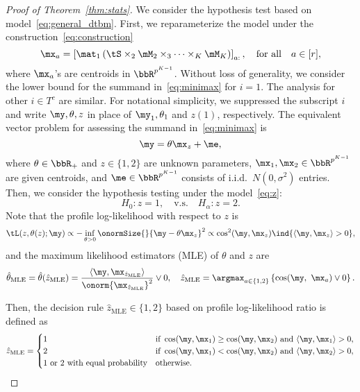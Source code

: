 \documentclass[lettersize,onecolumn,journal]{IEEEtran}
\theoremstyle{definition}
\theoremstyle{definition}
\newcommand{\of}[1]{\left(#1\right)}
\newcommand{\off}[1]{\left[#1\right]}
\newcommand{\offf}[1]{\left\{#1\right\}}
\begin{document}
\begin{proof}[Proof of Theorem~\ref{thm:stats}]
We consider the hypothesis test based on model~\eqref{eq:general_dtbm}. First, we reparameterize the model under the construction~\eqref{eq:construction}
\begin{equation}
    \mx_a = \off{\mat_1 \of{ \tS\times_2 \mM_2\times_3\cdots \times_K \mM_K  }}_{a:}, \quad \text{for all} \quad a \in [r],
\end{equation}
where $\mx_a$'s are centroids in $\bbR^{p^{K-1}}$. Without loss of generality, we consider the lower bound for the summand in~\eqref{eq:minimax} for $i=1$. The analysis for other $i\in T^c$ are similar. For notational simplicity, we suppressed the subscript $i$ and write $\my, \theta, z$ in place of $\my_1, \theta_1$ and $z(1)$, respectively. The equivalent vector problem for assessing the summand in~\eqref{eq:minimax} is
\begin{equation}\label{eq:z}
\my=\theta\mx_{z}+\me,
\end{equation}
where $\theta\in\bbR_{+}$ and $z\in \{1,2\}$ are unknown parameters, $\mx_1,\mx_2\in\bbR^{p^{K-1}}$ are given centroids, and $\me\in\bbR^{p^{K-1}}$ consists of i.i.d.\ $N(0,\sigma^2)$ entries.  Then, we consider the hypothesis testing under the model~\eqref{eq:z}:
\begin{equation}\label{eq:test}
H_0\colon z=1, \quad \text{v.s.}\quad H_\alpha\colon z=2.
\end{equation}
Note that the profile log-likelihood with respect to $z$ is
\[
\tL(z,  \theta(z);\my)\propto - \inf_{\theta>0}\onormSize{}{\my- \theta\mx_{z}}^2 \propto  \cos^2(\my, \mx_{z}) \ind\{ \langle \my,\mx_{z}\rangle  >0 \}, 
\]
and the maximum likelihood estimators (MLE) of $\theta$ and $z$ are
\begin{equation}\label{eq:MLE}
    \hat \theta_{\text{MLE}}= \hat \theta(\hat z_{\text{MLE}})={\langle \my,\mx_{\hat z_{\text{MLE}}}\rangle \over \onorm{\mx_{\hat z_{\text{MLE}}}}^2}\vee 0 , \quad 
\hat z_{\text{MLE}}= \argmax_{a\in\{1,2\}} \offf{\cos(\my,\ \mx_a)\vee 0}. 
\end{equation}

Then, the decision rule $\hat z_{\text{MLE}} \in\{1,2\}$ based on profile log-likelihood ratio is defined as
\begin{equation}\label{eq:ratio}
\hat z_{\text{MLE}}=
\begin{cases}
1 & \text{if }\cos(\my,\mx_1)\geq  \cos(\my,\mx_2) \text{ and }\langle \my,\mx_1\rangle > 0, \\
2 & \text{if }\cos(\my,\mx_1)<\cos(\my,\mx_2) \text{ and }\langle \my,\mx_2\rangle > 0,\\
\text{1 or 2 with equal probability} & \text{otherwise.}
\end{cases}
\end{equation}


\end{proof}
\end{document}
